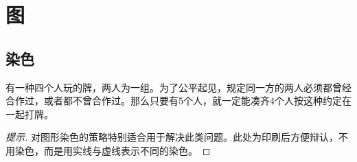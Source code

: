 
\section{图}
\label{sec:graphs}

\subsection{染色}
\begin{example}
  有一种四个人玩的牌，两人为一组。为了公平起见，规定同一方的两人必须都曾经合作过，或者都不曾合作过。那么只要有5个人，就一定能凑齐4个人按这种约定在一起打牌。
\end{example}
\begin{proof}[提示]对图形染色的策略特别适合用于解决此类问题。此处为印刷后方便辩认，不用染色，而是用实线与虚线表示不同的染色。
  

\end{proof}
